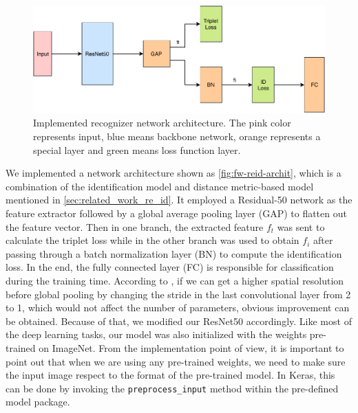 \begin{figure}
    \includegraphics[width=\linewidth]{figures/framework_reid_archit.pdf}
    \caption[Implemented recognizer network architecture]
    {
        Implemented recognizer network architecture.
        The pink color represents input, blue means backbone network, orange
        represents a special layer and green means loss function layer.
    }
    \label{fig:fw-reid-archit}
\end{figure}

We implemented a network architecture shown as \autoref{fig:fw-reid-archit},
which is a combination of the identification model and distance metric-based
model mentioned in \autoref{sec:related_work_re_id}. It employed a Residual-50
network as the feature extractor followed by a global average pooling layer
(GAP) to flatten out the feature vector. Then in one branch, the extracted
feature $f_t$ was sent to calculate the triplet loss while in
the other branch was used to obtain $f_i$ after passing through a batch 
normalization layer (BN) to compute the identification loss. 
In the end, the fully connected
layer (FC) is responsible for classification during the training time.
According to \cite{pcb-and-rpp-for-reid},
if we can get a higher spatial resolution before global pooling by changing the
stride in the last convolutional layer from 2 to 1, which would not affect the
number of parameters, obvious improvement can be obtained. Because of that, we
modified our ResNet50 accordingly. Like most of the deep learning tasks, our
model was also initialized with the weights pre-trained on ImageNet.
From the implementation point of view, it is important
to point out that when we are using any pre-trained weights, we need to make
sure the input image respect to the format of the pre-trained model. In Keras,
this can be done by invoking the \texttt{preprocess\_input} method within the
pre-defined model package.

